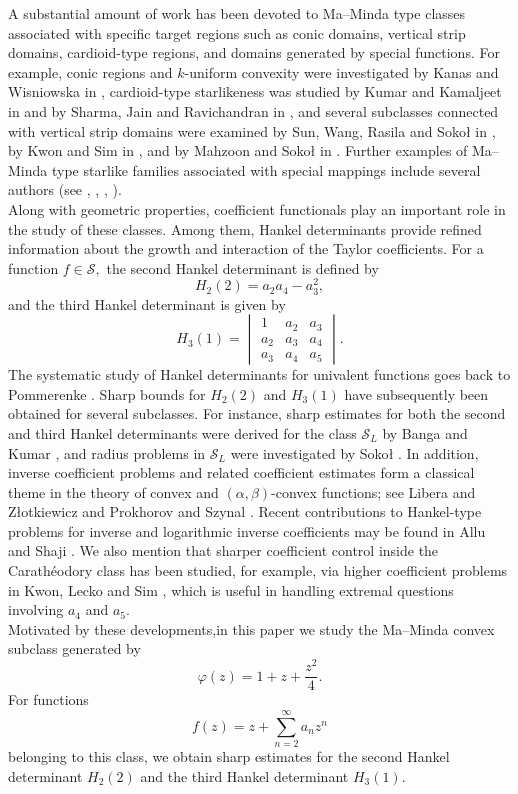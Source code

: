 \documentclass[a4paper,12pt,reqno]{amsart} %
\numberwithin{equation}{section}
\theoremstyle{definition}
\begin{document}
A substantial amount of work has been devoted to Ma--Minda type classes associated with specific target regions such as conic domains, vertical strip domains, cardioid-type regions, and domains generated by special functions. For example, conic regions and $k$-uniform convexity were investigated by Kanas and Wisniowska in \cite{KanasWisniowska1999}, cardioid-type starlikeness was studied by Kumar and Kamaljeet in \cite{KumarKamaljeet2021} and by Sharma, Jain and Ravichandran in \cite{SharmaJainRavichandran2016}, and several subclasses connected with vertical strip domains were examined by Sun, Wang, Rasila and Soko{\l} in \cite{SunWangRasilaSokol2019}, by Kwon and Sim in \cite{KwonSim2019}, and by Mahzoon and Soko{\l} in \cite{MahzoonSokol2023}. Further examples of Ma--Minda type starlike families associated with special mappings include several authors (see  \cite{GoelKumar2020}, \cite{KurokiOwa2012}, \cite{MendirattaNagpalRavichandran2015}, \cite{UralegaddiGanigiSarangi1994}).\\[2mm]
Along with geometric properties, coefficient functionals play an important role in the study of these classes. Among them, Hankel determinants provide refined information about the growth and interaction of the Taylor coefficients. For a function
$f\in \mathcal{S},$
the second Hankel determinant is defined by
\[
H_2(2)=a_2 a_4-a_3^2,
\]
and the third Hankel determinant is given by
\[
H_3(1)=
\begin{vmatrix}
	1 & a_2 & a_3\\
	a_2 & a_3 & a_4\\
	a_3 & a_4 & a_5
\end{vmatrix}.
\]
The systematic study of Hankel determinants for univalent functions goes back to Pommerenke \cite{Pommerenke1966}. Sharp bounds for $H_2(2)$ and $H_3(1)$ have subsequently been obtained for several subclasses. For instance, sharp estimates for both the second and third Hankel determinants were derived for the class $\mathcal{S}_L$ by Banga and Kumar \cite{BangaKumar2020}, and radius problems in $\mathcal{S}_L$ were investigated by Soko{\l} \cite{Sokol2009}. In addition, inverse coefficient problems and related coefficient estimates form a classical theme in the theory of convex and $(\alpha,\beta)$-convex functions; see Libera and Z{\l}otkiewicz \cite{LiberaZlotkiewicz1982} and Prokhorov and Szynal \cite{ProkhorovSzynal1981}. Recent contributions to Hankel-type problems for inverse and logarithmic inverse coefficients may be found in Allu and Shaji \cite{VasuAmal2025}. We also mention that sharper coefficient control inside the Carath\'eodory class has been studied, for example, via higher coefficient problems in Kwon, Lecko and Sim \cite{KwonLeckoSim2018}, which is useful in handling extremal questions involving $a_4$ and $a_5$.\\[2mm]
Motivated by these developments,in this paper  we study  the Ma--Minda convex subclass generated by
\[
\varphi(z)=1+z+\frac{z^2}{4}.
\]
For functions
\[
f(z)=z+\sum_{n=2}^{\infty}a_n z^n
\]
belonging to this class, we obtain sharp estimates for the second Hankel determinant $H_2(2)$ and the third Hankel determinant $H_3(1)$.
\end{document}
